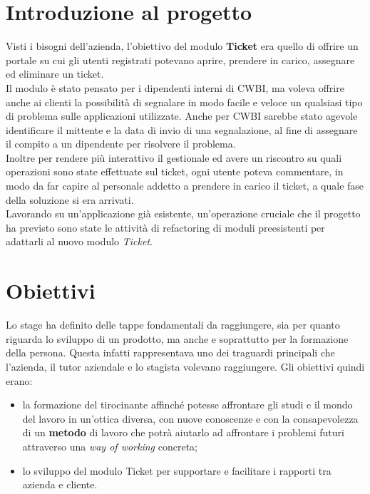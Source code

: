 \section{Introduzione al progetto}
Visti i bisogni dell'azienda, l'obiettivo del modulo \textbf{Ticket} era quello di offrire un portale su cui gli utenti registrati potevano aprire, prendere in carico, assegnare ed eliminare un ticket. \\
Il modulo è stato pensato per i dipendenti interni di CWBI, ma voleva offrire anche ai clienti la possibilità di segnalare in modo facile e veloce un qualsiasi tipo di problema sulle applicazioni utilizzate. Anche per CWBI sarebbe stato agevole identificare il mittente e la data di invio di una segnalazione, al fine di assegnare il compito a un dipendente per risolvere il problema.\\ 
Inoltre per rendere più interattivo il gestionale ed avere un riscontro su quali operazioni sono state effettuate sul ticket, ogni utente poteva commentare, in modo da far capire al personale addetto a prendere in carico il ticket, a quale fase della soluzione si era arrivati.\\
Lavorando su un'applicazione già esistente, un'operazione cruciale che il progetto ha previsto sono state le attività di refactoring di moduli preesistenti per adattarli al nuovo modulo \textit{Ticket}. 

\section{Obiettivi}
Lo stage ha definito delle tappe fondamentali da raggiungere, sia per quanto riguarda lo sviluppo di un prodotto, ma anche e soprattutto per la formazione della persona. Questa infatti rappresentava uno dei traguardi principali che l'azienda, il tutor aziendale e lo stagista volevano raggiungere. Gli obiettivi quindi erano:
\begin{itemize}
\item la formazione del tirocinante affinché potesse affrontare gli studi e il mondo del lavoro in un'ottica diversa, con nuove conoscenze e con la consapevolezza di un \textbf{metodo} di lavoro che potrà aiutarlo ad affrontare i problemi futuri attraverso una \textit{way of working} concreta;
\item lo sviluppo del modulo Ticket per supportare e facilitare i rapporti tra azienda e cliente.
\end{itemize}


